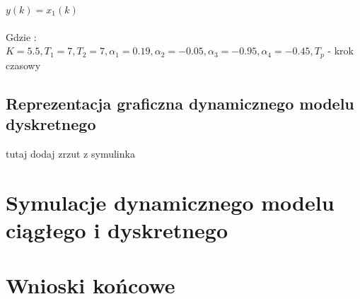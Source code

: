 \documentclass[a4paper, 11pt]{article}
\begin{document}
$y(k) = x_1(k)$
\\
\\
Gdzie : \\

$K  = 5.5, T_1 = 7, T_2 = 7, \alpha_1 = 0.19, \alpha_2 = -0.05, \alpha_3 = -0.95, \alpha_4 = -0.45, T_p$ - krok czasowy
\\


\subsection{Reprezentacja graficzna dynamicznego modelu dyskretnego}

tutaj dodaj zrzut z symulinka

\section{Symulacje dynamicznego modelu ciągłego i dyskretnego}



\section{Wnioski końcowe}
\end{document}
